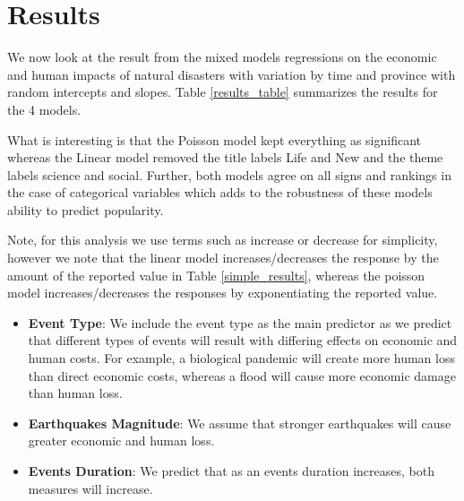 \section{Results}
We now look at the result from the mixed models regressions on the economic and human impacts of natural disasters with variation by time and province with random intercepts and slopes. Table \ref{results_table} summarizes the results for the 4 models.



What is interesting is that the Poisson model kept everything as significant whereas the Linear model removed the title labels Life and New and the theme labels science and social. Further, both models agree on all signs and rankings in the case of categorical variables which adds to the robustness of these models ability to predict popularity. 

Note, for this analysis we use terms such as increase or decrease for simplicity, however we note that the linear model increases/decreases the response by the amount of the reported value in Table \ref{simple_results}, whereas the poisson model increases/decreases the responses by exponentiating the reported value.

\begin{itemize}
	\item \textbf{Event Type}: We include the event type as the main predictor as we predict that different types of events will result with differing effects on economic and human costs. For example, a biological pandemic will create more human loss than direct economic costs, whereas a flood will cause more economic damage than human loss.
	\item \textbf{Earthquakes Magnitude}: We assume that stronger earthquakes will cause greater economic and human loss.
	\item \textbf{Events Duration}: We predict that as an events duration increases, both measures will increase. 
\end{itemize}


